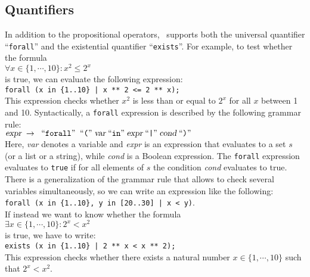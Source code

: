 \subsection{Quantifiers}
In addition to the propositional operators, \setlx\ supports both the universal quantifier
``\texttt{forall}'' and the existential quantifier ``\texttt{exists}''.  For example, to test whether the formula
\\[0.2cm]
\hspace*{1.3cm}
$\forall x \in \{ 1, \cdots, 10 \}: x^2 \leq 2^x$
\\[0.2cm]
is true, we can evaluate the following expression:
\\[0.2cm]
\hspace*{1.3cm}
\texttt{forall (x in \{1..10\} | x ** 2 <= 2 ** x);}
\\[0.2cm]
This expression checks whether $x^2$ is less than or equal to $2^x$ for all $x$ between 1 and
10.  Syntactically, a \texttt{forall} expression is described by the following grammar
rule: 
\\[0.2cm]
\hspace*{1.3cm}
$\textsl{expr} \;\rightarrow\; \;\mbox{``\texttt{forall}''}\; \;\mbox{``\texttt{(}''}\; \textsl{var} \;\mbox{``\texttt{in}''}\;
 \textsl{expr} \;\mbox{``\texttt{|}''}\; \textsl{cond} \;\mbox{``\texttt{)}''}\;
$
\\[0.2cm]
Here, \textsl{var} denotes a variable and \textsl{expr} is an expression that evaluates
to a set $s$ (or a list  or a string), while \textsl{cond} is a Boolean expression.  The
\texttt{forall} expression evaluates to \texttt{true} if for all elements of $s$ the
condition \textsl{cond} evaluates to true.  There is a generalization of the grammar rule 
that allows to check several variables simultaneously, so we can write an expression like
the following:
\\[0.2cm]
\hspace*{1.3cm}
\texttt{forall (x in \{1..10\}, y in [20..30] | x < y)}.
\\[0.2cm]
If instead we want to know whether the formula
\\[0.2cm]
\hspace*{1.3cm}
$\exists x \in \{ 1, \cdots, 10 \}: 2^x < x^2$
\\[0.2cm]
is true, we have to write:
\\[0.2cm]
\hspace*{1.3cm}
\texttt{exists (x in \{1..10\} | 2 ** x < x ** 2);}
\\[0.2cm]
This expression checks whether there exists a natural number $x \in \{1, \cdots, 10\}$
such that $2^x< x^2$.
\vspace*{0.3cm}

